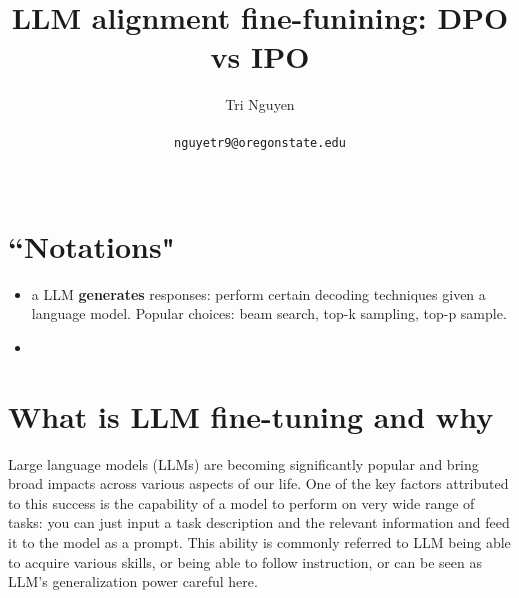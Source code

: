 \documentclass[11pt,a4paper]{article}
\title{LLM alignment fine-funining: DPO vs IPO}
\author{	Tri Nguyen \\\\
        \texttt{nguyetr9@oregonstate.edu} \\\\
        }
\begin{document}
\maketitle
\section{``Notations"}%
\label{sec:_notations_}
\begin{itemize}
    \item a LLM \textbf{generates} responses: perform certain decoding techniques given a language model. Popular choices: beam search, top-k sampling, top-p sample.
    \item 
\end{itemize}



\section{What is LLM fine-tuning and why}%
\label{sec:introduction}
Large language models (LLMs) are becoming significantly popular and bring broad impacts across various aspects of our life. One of the key factors attributed to this success is the capability of a model to perform on very wide range of tasks: you can just input a task description and the relevant information and feed it to the model as a prompt. This ability is commonly referred to LLM being able to acquire various skills, or being able to follow instruction, or can be seen as LLM's generalization power {\red careful here}. 
\end{document}
